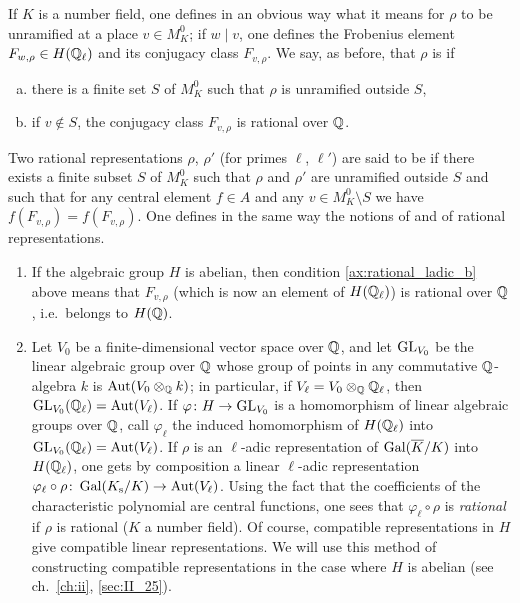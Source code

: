 If $K$ is a number field, one defines in an obvious way what it
\dpage
means for $\rho$ to be unramified at a place $v \in M_K^0$; if $w\mid v$, one
defines the Frobenius element $F_{w, \rho} \in H(\mathbb{Q}_\ell)$ and its conjugacy
class $F_{v, \rho}$. We say, as before, that $\rho$ is  if
\begin{enumerate}[(a)]
\item\label{ax:rational_ladic_a}
	there is a finite set $S$ of $M_K^0$ such that $\rho$ is unramified
	outside $S$,
\item\label{ax:rational_ladic_b}
	if $v \notin S$, the conjugacy class $F_{v, \rho}$ is rational over $\mathbb{Q}$.
\end{enumerate}
Two rational representations $\rho$, $\rho'$ (for primes $\ell$, $\ell'$) are said to
be  if there exists a finite subset $S$ of $M_K^0$ such that $\rho$
and $\rho'$ are unramified outside $S$ and such that for any central 
element $f \in A$ and any $v \in M_K^0 \setminus S$ we have $f(F_{v, \rho}) = f(F_{v, \rho})$. One
defines in the same way the notions of  and  of rational representations.

\begin{obs}
\begin{enumerate}
\item If the algebraic group $H$ is abelian, then condition
	\ref{ax:rational_ladic_b} above means that $F_{v, \rho}$ (which is now
	an element of $H(\mathbb{Q}_\ell)$) is rational over $\mathbb{Q}$, i.e.\ belongs to
	$H(\mathbb{Q})$.
\item Let $V_0$ be a finite-dimensional vector space over $\mathbb{Q}$, and
	let $\operatorname{GL}_{V_0}$ be the linear algebraic group over $\mathbb{Q}$ whose group of
	points in any commutative $\mathbb{Q}$-algebra $k$ is $\operatorname{Aut}(V_0 \otimes_{\mathbb{Q}} k)$; in 
	particular, if $V_\ell = V_0 \otimes_{\mathbb{Q}} \mathbb{Q}_\ell$, then
	$\operatorname{GL}_{V_0}(\mathbb{Q}_\ell) = \operatorname{Aut}(V_\ell)$. If $\varphi \colon H \to
	\operatorname{GL}_{V_0}$ is a homomorphism of linear algebraic groups over $\mathbb{Q}$, call
	$\varphi_\ell$ the induced homomorphism of $H(\mathbb{Q}_\ell)$ into
	$\operatorname{GL}_{V_0}(\mathbb{Q}_\ell) = \operatorname{Aut}(V_\ell)$. If $\rho$ is an $\ell$-adic
	representation of $\operatorname{Gal}(\overline{K}/K)$ into $H(\mathbb{Q}_\ell)$, one gets by
	composition a linear $\ell$-adic representation $\varphi_\ell \circ
	\rho \colon \operatorname{Gal}(K_{\mathrm{s}}/K) \to \operatorname{Aut}(V_\ell)$. Using the fact that the
	coefficients of the characteristic polynomial are central functions,
	one sees that
	\dpage
	$\varphi_\ell \circ \rho$ is \emph{rational} if $\rho$ is rational ($K$
	a number field).  Of course, compatible representations in $H$ give
	compatible linear representations. We will use this method of
	constructing compatible representations in the case where $H$ is
	abelian (see ch.~\ref{ch:ii}, \ref{sec:II_25}).
\end{enumerate}
\end{obs}

